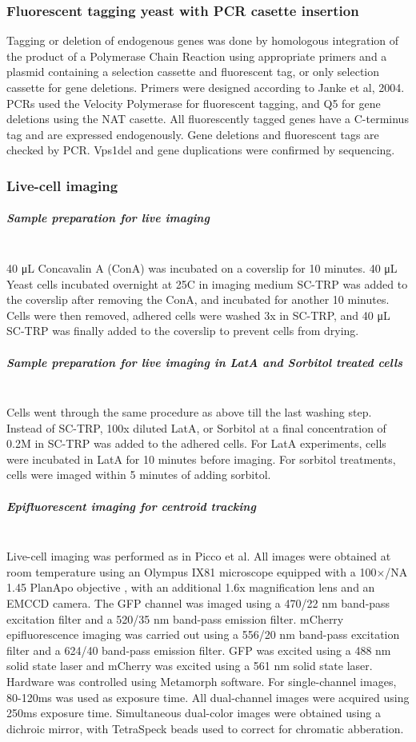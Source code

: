 \subsubsection{Fluorescent tagging yeast with PCR casette insertion}
Tagging or deletion of endogenous genes was done by homologous integration of the product of a Polymerase Chain Reaction using appropriate primers and a plasmid containing a selection cassette and fluorescent tag, or only selection cassette for gene deletions. Primers were designed according to Janke et al, 2004. PCRs used the Velocity Polymerase for fluorescent tagging, and Q5 for gene deletions using the NAT casette. 
All fluorescently tagged genes have a C-terminus tag and are expressed endogenously.
Gene deletions and fluorescent tags are checked by PCR. Vps1del and gene duplications were confirmed by sequencing. 

\subsubsection{Live-cell imaging}
\subparagraph{Sample preparation for live imaging}
			\mbox{}\\
40 μL Concavalin A (ConA) was incubated on a coverslip for 10 minutes. 40 μL Yeast cells incubated overnight at 25C in imaging medium SC-TRP was added to the coverslip after removing the ConA, and incubated for another 10 minutes. Cells were then removed, adhered cells were washed 3x in SC-TRP, and 40 μL SC-TRP was finally added to the coverslip to prevent cells from drying. 

\subparagraph{Sample preparation for live imaging in LatA and Sorbitol treated cells}
\mbox{}\\
Cells went through the same procedure as above till the last washing step. Instead of SC-TRP, 100x diluted LatA, or Sorbitol at a final concentration of 0.2M in SC-TRP was added to the adhered cells. For LatA experiments, cells were incubated in LatA for 10 minutes before imaging. For sorbitol treatments, cells were imaged within 5 minutes of adding sorbitol.

\subparagraph{Epifluorescent imaging for centroid tracking}
			\mbox{}\\
Live-cell imaging was performed as in Picco et al. All images were obtained at room temperature using an Olympus IX81 microscope equipped with a 100×/NA 1.45 PlanApo objective , with an additional 1.6x magnification lens and an EMCCD camera. The GFP channel was imaged using a 470/22 nm band-pass excitation filter and a 520/35 nm band-pass emission filter. mCherry epifluorescence imaging was carried out using a 556/20 nm band-pass excitation filter and a 624/40 band-pass emission filter. GFP was excited using a 488 nm solid state laser and mCherry was excited using a 561 nm solid state laser. Hardware was controlled using Metamorph software. For single-channel images, 80-120ms was used as exposure time. All dual-channel images were acquired using 250ms exposure time. Simultaneous dual-color images were obtained using a dichroic mirror, with TetraSpeck beads used to correct for chromatic abberation.

